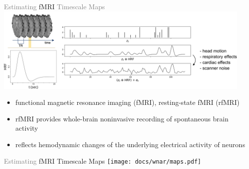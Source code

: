 \documentclass[8pt,aspectratio=169]{beamer}
\begin{document}
\begin{frame}{\textcolor{gray}{Estimating} fMRI \textcolor{gray}{Timescale Maps}}
     \centering\includegraphics[width=0.95\textwidth]{docs/wnar/fmri.pdf}
     \vfill
     \begin{itemize}
         \item functional magnetic resonance imaging (fMRI), resting-state fMRI (rfMRI)
         \item rfMRI provides whole-brain noninvasive recording of spontaneous brain activity 
         \item reflects hemodynamic changes of the underlying electrical activity of neurons
     \end{itemize}
\end{frame}

\begin{frame}{\textcolor{gray}{Estimating} fMRI Timescale Maps}
    \vspace{5mm}
    \centering\texttt{[image: docs/wnar/maps.pdf]}
\end{frame}
\end{document}
